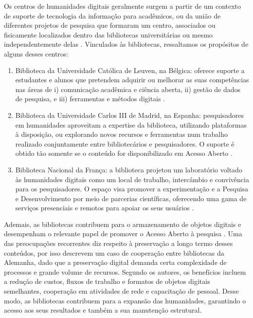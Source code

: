 \documentclass[portuguese]{textolivre}
\begin{document}
Os centros de humanidades digitais geralmente surgem a partir de um contexto de suporte de tecnologia da informação para acadêmicos, ou da união de diferentes projetos de pesquisa que formaram um centro, associados ou fisicamente localizados dentro das bibliotecas universitárias ou mesmo independentemente delas \cite{warwick2012}. Vinculados às bibliotecas, ressaltamos os propósitos de alguns desses centros:

\begin{enumerate}
    \item Biblioteca da Universidade Católica de Leuven, na Bélgica: oferece suporte a estudantes e alunos que pretendem adquirir ou melhorar as suas competências nas áreas de i) comunicação acadêmica e ciência aberta, ii) gestão de dados de pesquisa, e iii) ferramentas e métodos digitais \cite{budke2022}.
    \item Biblioteca da Universidade Carlos III de Madrid, na Espanha: pesquisadores em humanidades aproveitam a expertise da biblioteca, utilizando plataformas à disposição, ou explorando novos recursos e ferramentas num trabalho realizado conjuntamente entre bibliotecários e pesquisadores. O suporte é obtido tão somente se o conteúdo for disponibilizado em Acesso Aberto \cite{aguilera2021}.
    \item Biblioteca Nacional da França: a biblioteca projetou um laboratório voltado às humanidades digitais como um local de trabalho, intercâmbio e convivência para os pesquisadores. O espaço visa promover a experimentação e a Pesquisa e Desenvolvimento por meio de parcerias científicas, oferecendo uma gama de serviços presenciais e remotos para apoiar os seus usuários \cite{carlin2021}.
\end{enumerate}

Ademais, as bibliotecas contribuem para o armazenamento de objetos digitais e desempenham o relevante papel de promover o Acesso Aberto à pesquisa \cite{liu2023}. Uma das preocupações recorrentes diz respeito à preservação a longo termo desses conteúdos, por isso \textcite{zarnitz2019} descrevem um caso de cooperação entre bibliotecas da Alemanha, dado que a preservação digital demanda certa complexidade de processos e grande volume de recursos. Segundo os autores, os benefícios incluem a redução de custos, fluxos de trabalho e formatos de objetos digitais semelhantes, cooperação em atividades de rede e capacitação de pessoal. Desse modo, as bibliotecas contribuem para a expansão das humanidades, garantindo o acesso aos seus resultados e também a sua manutenção estrutural.
\end{document}
